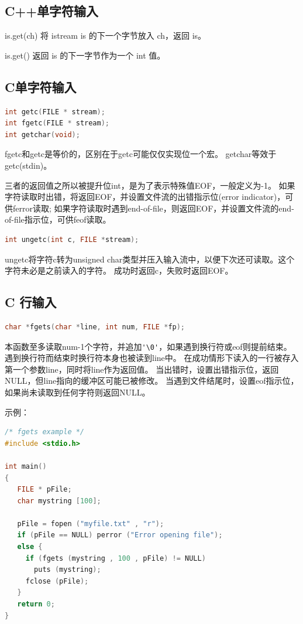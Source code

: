 \subsection{C++单字符输入}
is.get(ch)  将 istream is 的下一个字节放入 ch，返回 is。

is.get()  返回 is 的下一字节作为一个 int 值。

\subsection{C单字符输入}
\begin{lstlisting}[language=C]
int getc(FILE * stream);
int fgetc(FILE * stream);
int getchar(void);
\end{lstlisting}
fgetc和getc是等价的，区别在于getc可能仅仅实现位一个宏。
getchar等效于getc(stdin)。

三者的返回值之所以被提升位int，是为了表示特殊值EOF，一般定义为-1。
如果字符读取时出错，将返回EOF，并设置文件流的出错指示位(error indicator)，可供ferror读取;
如果字符读取时遇到end-of-file，则返回EOF，并设置文件流的end-of-file指示位，可供feof读取。

\begin{lstlisting}[language=C++]
int ungetc(int c, FILE *stream);
\end{lstlisting}
ungetc将字符c转为unsigned char类型并压入输入流中，以便下次还可读取。这个字符未必是之前读入的字符。
成功时返回c，失败时返回EOF。



\subsection{C 行输入}

\begin{lstlisting}[language=C++]
char *fgets(char *line, int num, FILE *fp);
\end{lstlisting}
本函数至多读取num-1个字符，并追加\verb$'\0'$，如果遇到换行符或eof则提前结束。
遇到换行符而结束时换行符本身也被读到line中。
在成功情形下读入的一行被存入第一个参数line，同时将line作为返回值。
当出错时，设置出错指示位，返回NULL，但line指向的缓冲区可能已被修改。
当遇到文件结尾时，设置eof指示位，如果尚未读取到任何字符则返回NULL。

示例：
\begin{lstlisting}[language=C++]
/* fgets example */
#include <stdio.h>

int main()
{
   FILE * pFile;
   char mystring [100];

   pFile = fopen ("myfile.txt" , "r");
   if (pFile == NULL) perror ("Error opening file");
   else {
     if (fgets (mystring , 100 , pFile) != NULL)
       puts (mystring);
     fclose (pFile);
   }
   return 0;
}
\end{lstlisting}

